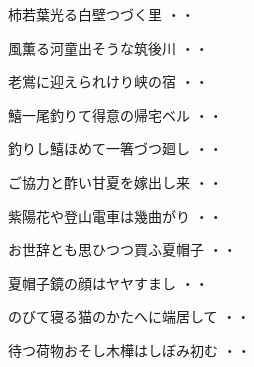 \begin{shiika}柿若葉光る白壁つづく里
\hfill{・・}\end{shiika}
\vspace{0.6cm}
\begin{shiika}風薫る河童出そうな筑後川
\hfill{・・}\end{shiika}
\vspace{0.6cm}
\begin{shiika}老鴬に迎えられけり峡の宿
\hfill{・・}\end{shiika}
\vspace{0.6cm}
\begin{shiika}鱚一尾釣りて得意の帰宅ベル
\hfill{・・}\end{shiika}
\vspace{0.6cm}
\begin{shiika}釣りし鱚ほめて一箸づつ廻し
\hfill{・・}\end{shiika}
\vspace{0.6cm}
\begin{shiika}ご協力と酢い甘夏を嫁出し来
\hfill{・・}\end{shiika}
\vspace{0.6cm}
\begin{shiika}紫陽花や登山電車は幾曲がり
\hfill{・・}\end{shiika}
\vspace{0.6cm}
\begin{shiika}お世辞とも思ひつつ買ふ夏帽子
\hfill{・・}\end{shiika}
\vspace{0.6cm}
\begin{shiika}夏帽子鏡の顔はヤヤすまし
\hfill{・・}\end{shiika}
\vspace{0.6cm}
\begin{shiika}のびて寝る猫のかたへに端居して
\hfill{・・}\end{shiika}
\vspace{0.6cm}
\begin{shiika}待つ荷物おそし木樺はしぼみ初む
\hfill{・・}\end{shiika}
\vspace{0.6cm}
